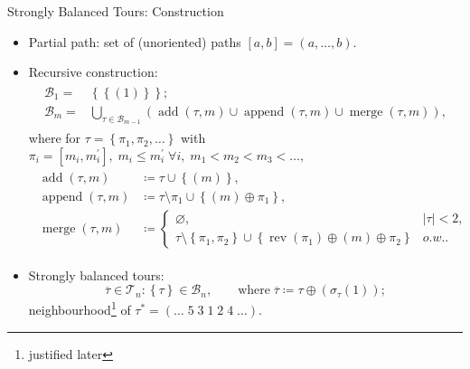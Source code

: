\documentclass[
  size=8pt,
  style=klope,
  paper=screen,
  mode=present,
  nohandoutpagebreaks,
  pauseslide,
  hlsections,
  fleqn,
]{powerdot}
\def\board{{\color{green} [Optional: board.]}}
\def\eqitspace{\vspace{-5mm}}
\begin{document}
\begin{slide}[toc=]{Strongly Balanced Tours: Construction}
  \begin{itemize}
    \item
    Partial path: set of (unoriented) paths $\left[a,b\right] = \left(a,\ldots,b\right)$.
    \item
    Recursive construction:
    \begin{align}
      \begin{split}
      \mathcal{B}_1 = & \left\{ \left\{\left(1\right)\right\} \right\};
      \\
      \mathcal{B}_m = & \bigcup_{\tau \in \mathcal{B}_{m-1}}
        \left(
        \operatorname{add}\left(\tau,m\right)
        \cup
        \operatorname{append}\left(\tau,m\right)
        \cup
        \operatorname{merge}\left(\tau,m\right)
        \right),
      \end{split}
    \end{align}
    where for
        $ \tau = \left\{ \pi_1, \pi_2, \ldots \right\} $
        with
        $
        \pi_i = \left[m_i,m_i^\prime\right], \;
        m_i \leq m_i^\prime%
        \; \forall i, \;
        m_1 < m_2 < m_3 < \ldots ,
        $
    \begin{align}
      \begin{split}
        \operatorname{add}\left(\tau,m\right) & \coloneqq \tau \cup \left\{ \left(m\right) \right\},
        \\
        \operatorname{append}\left(\tau,m\right) & \coloneqq \tau \setminus \pi_1 \cup \left\{ \left(m\right) \oplus \pi_1 \right\},
        \\
        \operatorname{merge}\left(\tau,m\right) & \coloneqq
        \begin{cases}
          \varnothing, & \lvert\tau\rvert < 2,
          \\
          \tau \setminus \left\{\pi_1,\pi_2\right\} \cup \left\{ \operatorname{rev}\left(\pi_1\right) \oplus \left(m\right) \oplus \pi_2 \right\} & o.w..
        \end{cases}
      \end{split}
    \end{align}
    \vspace{-3mm}
  \item
    Strongly balanced tours:
    \begin{equation}
      \overline{\tau} \in \mathcal{T}_n : \left\{\tau\right\} \in \mathcal{B}_n,
      \qquad
      \text{where} \;
      \overline{\tau} \coloneqq \tau \oplus \left(\sigma_\tau\left(1\right)\right);
    \end{equation}
    neighbourhood\footnote{justified later} of $\tau^\ast =
      \left( \ldots \; 5 \; 3 \; 1 \; 2 \; 4 \; \ldots \right).$
  \end{itemize}
\end{slide}
\end{document}
